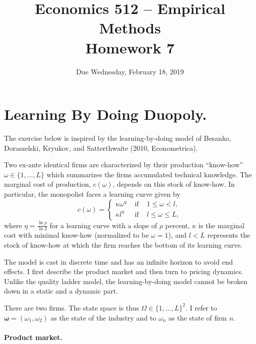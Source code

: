 \documentclass[11pt]{article}
\begin{document}
\onehalfspace

\title{Economics 512 -- Empirical Methods \\ Homework 7}
\author{Due Wednesday, February 18, 2019}
\date{}
\maketitle

\section*{Learning By Doing Duopoly.}

The exercise below is inspired by the learning-by-doing model of Besanko,
Doraszelski, Kryukov, and Satterthwaite (2010, Econometrica).

Two ex-ante identical firms are characterized by their production ``know-how'' $\omega
\in \{1,\ldots,L\}$ which summarizes the firms accumulated technical knowledge. 
The marginal cost of production, $c(\omega)$,
depends on this stock of know-how. In particular, the monopolist
faces a learning curve given by
\begin{equation*}
c(\omega )=\left\{
\begin{array}{ccc}
\kappa \omega ^{\eta } & \mbox{ if } & 1\leq \omega <l, \\
\kappa l^{\eta } & \mbox{ if } & l\leq \omega \leq L,%
\end{array}
\right.
\end{equation*}
where $\eta =\frac{\ln \rho }{\ln 2}$ for a learning curve with a
slope of $\rho $ percent, $\kappa $ is the marginal cost with
minimal know-how (normalized to be $\omega =1$), and $l<L$
represents the stock of know-how at which the firm reaches the
bottom of its learning curve.

The model is cast in discrete time and has an infinite horizon to
avoid end effects. I first describe the product market and then turn
to pricing dynamics. Unlike the quality ladder model, the
learning-by-doing model cannot be broken down in a static and a
dynamic part.

There are two firms.  The state space is thus
$\Omega \in \{1,\ldots,L\}^2$. I refer to $\mathbf{\omega}=(\omega_1,\omega_2)$ 
as the state of the industry and to $\omega_n$ as the state of firm $n$.

\paragraph{Product market.}
\end{document}
